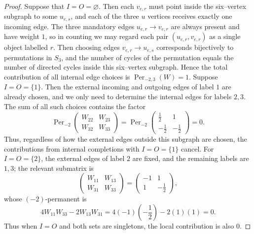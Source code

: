 \documentclass[11pt,a4paper]{article}
\begin{document}
\begin{proof}
Suppose that $I=O=\varnothing$. Then each $v_{e,r}$ must point inside the six–vertex subgraph to some $u_{e,s}$, and each of the three $u$ vertices receives exactly one incoming edge. The three mandatory edges $u_{e,r}\to v_{e,r}$ are always present and have weight $1$, so in counting we may regard each pair $(u_{e,r},v_{e,r})$ as a single object labelled $r$. Then choosing edges $v_{e,r}\to u_{e,s}$ corresponds bijectively to permutations in $S_3$, and the number of cycles of the permutation equals the number of directed cycles inside this six–vertex subgraph. Hence the total contribution of all internal edge choices is $\operatorname{Per}_{-2,3}(W)=1$. Suppose $I=O=\{1\}$. Then the external incoming and outgoing edges of label $1$ are already chosen, and we only need to determine the internal edges for labels $2,3$. The sum of all such choices contains the factor
\[
  \operatorname{Per}_{-2}
  \begin{pmatrix}
    W_{22}&W_{23}\\
    W_{32}&W_{33}
  \end{pmatrix}
  =\operatorname{Per}_{-2}
  \begin{pmatrix}
    \frac12&1\\[-1mm]
    -\frac12&-\frac12
  \end{pmatrix}=0.
\]
Thus, regardless of how the external edges outside this subgraph are chosen, the contributions from internal completions with $I=O=\{1\}$ cancel. For $I=O=\{2\}$, the external edges of label $2$ are fixed, and the remaining labels are $1,3$; the relevant submatrix is
\[
  \begin{pmatrix}
    W_{11}&W_{13}\\
    W_{31}&W_{33}
  \end{pmatrix}
  =
  \begin{pmatrix}
    -1&1\\
    1&-\frac12
  \end{pmatrix},
\]
whose $(-2)$-permanent is
\[
  4W_{11}W_{33}-2W_{13}W_{31}
  =4(-1)\left(-\frac12\right)-2(1)(1)=0.
\]
Thus when $I=O$ and both sets are singletons, the local contribution is also $0$.


\end{proof}
\end{document}
